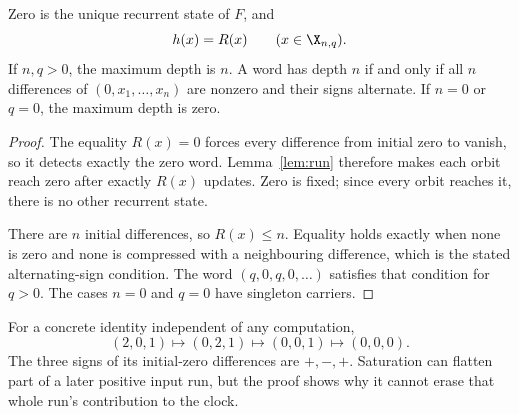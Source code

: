 \begin{theorem}\label{thm:clock}
Zero is the unique recurrent state of $F$, and
\begin{equation}\label{eq:clock}
 h(x)=R(x)\qquad(x\in\X_{n,q}).
\end{equation}
If $n,q>0$, the maximum depth is $n$. A word has depth $n$ if and only
if all $n$ differences of $(0,x_1,\ldots,x_n)$ are nonzero and their
signs alternate. If $n=0$ or $q=0$, the maximum depth is zero.
\end{theorem}
\begin{proof}
The equality $R(x)=0$ forces every difference from initial zero to vanish,
so it detects exactly the zero word. Lemma~\ref{lem:run} therefore makes
each orbit reach zero after exactly $R(x)$ updates. Zero is fixed; since
every orbit reaches it, there is no other recurrent state.

There are $n$ initial differences, so $R(x)\le n$. Equality holds exactly
when none is zero and none is compressed with a neighbouring difference,
which is the stated alternating-sign condition. The word
$(q,0,q,0,\ldots)$ satisfies that condition for $q>0$. The cases
$n=0$ and $q=0$ have singleton carriers.
\end{proof}

For a concrete identity independent of any computation,
\[
 (2,0,1)\longmapsto(0,2,1)\longmapsto(0,0,1)
       \longmapsto(0,0,0).
\]
The three signs of its initial-zero differences are $+,-,+$.
Saturation can flatten part of a later positive input run, but the proof
shows why it cannot erase that whole run's contribution to the clock.
